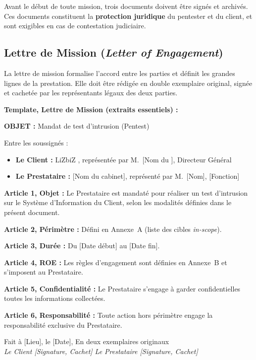 Avant le début de toute mission, trois documents doivent être signés et archivés.
Ces documents constituent la \textbf{protection juridique} du pentester et du
client, et sont exigibles en cas de contestation judiciaire.

\subsection{Lettre de Mission (\textit{Letter of Engagement})}

La lettre de mission formalise l'accord entre les parties et définit les grandes
lignes de la prestation. Elle doit être rédigée en double exemplaire original,
signée et cachetée par les représentants légaux des deux parties.

\begin{boxlizbiz}
\textbf{Template, Lettre de Mission (extraits essentiels) :}

\medskip
\textbf{OBJET :} Mandat de test d'intrusion (Pentest)

\medskip
Entre les soussignés :
\begin{itemize}
    \item \textbf{Le Client :} LiZbiZ , représentée par
          M.~[Nom du ], Directeur Général
    \item \textbf{Le Prestataire :} [Nom du cabinet], représenté par
          M.~[Nom], [Fonction]
\end{itemize}

\medskip
\textbf{Article 1, Objet :} Le Prestataire est mandaté pour réaliser un test
d'intrusion sur le Système d'Information du Client, selon les modalités définies
dans le présent document.

\textbf{Article 2, Périmètre :} Défini en Annexe~A (liste des cibles
\textit{in-scope}).

\textbf{Article 3, Durée :} Du [Date début] au [Date fin].

\textbf{Article 4, ROE :} Les règles d'engagement sont définies en Annexe~B
et s'imposent au Prestataire.

\textbf{Article 5, Confidentialité :} Le Prestataire s'engage à garder
confidentielles toutes les informations collectées.

\textbf{Article 6, Responsabilité :} Toute action hors périmètre engage la
responsabilité exclusive du Prestataire.

\medskip
Fait à [Lieu], le [Date], En deux exemplaires originaux\\
\textit{Le Client [Signature, Cachet] \hfill Le Prestataire [Signature, Cachet]}
\end{boxlizbiz}

